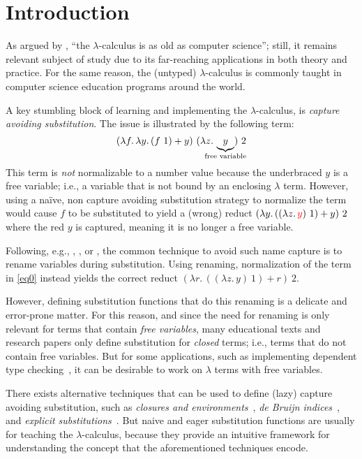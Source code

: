 \section{Introduction}

As argued by \citet{Accattoli19}, ``the $\lambda$-calculus is as old as computer science''; still, it remains relevant subject of study due to its far-reaching applications in both theory and practice.
For the same reason, the (untyped) $\lambda$-calculus is commonly taught in computer science education programs around the world.

A key stumbling block of learning and implementing the $\lambda$-calculus, is \emph{capture avoiding substitution}.
The issue is illustrated by the following term:
\begin{equation}
  (\lambda f .\, \lambda y .\, (f\ 1) + y)\ (\lambda z .\, \underbrace{y}_{\mathclap{\text{free variable}}})\ 2
  \label{eq0}
\end{equation}
This term is \emph{not} normalizable to a number value because the underbraced $y$ is a free variable; i.e., a variable that is not bound by an enclosing $\lambda$ term.
However, using a na\"{i}ve, non capture avoiding substitution strategy to normalize the term would cause $f$ to be substituted to yield a (wrong) reduct $(\lambda y .\, ((\lambda z .\, {\color{red} y})\ 1) + y)\ 2$ where the {\color{red} red} $y$ is captured, meaning it is no longer a free variable.

Following, e.g., \citet{curry1958combinatory}, \citet{Plotkin75}, or \citet{DBLP:books/daglib/0067558}, the common technique to avoid such name capture is to rename variables during substitution.
Using renaming, normalization of the term in \cref{eq0} instead yields the correct reduct $(\lambda r .\, ((\lambda z .\, y)\ 1) + r)\ 2$.

However, defining substitution functions that do this renaming is a delicate and error-prone matter.
For this reason, and since the need for renaming is only relevant for terms that contain \emph{free variables}, many educational texts and research papers only define substitution for \emph{closed} terms; i.e., terms that do not contain free variables.
But for some applications, such as implementing dependent type checking~\citep{Pareto1995ALF}, it can be desirable to work on $\lambda$ terms with free variables.

There exists alternative techniques that can be used to define (lazy) capture avoiding substitution, such as \emph{closures and environments}~\citep{Landin64}, \emph{de Bruijn indices}~\citep{de_Bruijn_1972}, and \emph{explicit substitutions}~\citep{AbadiCCL91}.
But naive and eager substitution functions are usually for teaching the $\lambda$-calculus, because they provide an intuitive framework for understanding the concept that the aforementioned techniques encode.

